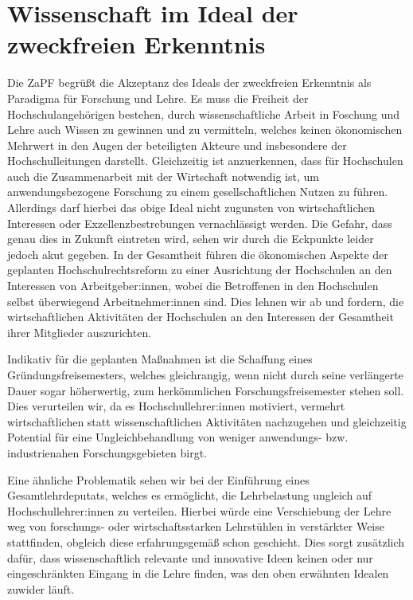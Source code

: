 \documentclass[a4paper]{scrartcl}
\begin{document}
\section{Wissenschaft im Ideal der zweckfreien Erkenntnis}

Die ZaPF begrüßt die Akzeptanz des Ideals der zweckfreien Erkenntnis als Paradigma für Forschung und Lehre.
Es muss die Freiheit der Hochschulangehörigen bestehen, durch wissenschaftliche Arbeit in Foschung und Lehre auch Wissen zu gewinnen und zu vermitteln, welches keinen ökonomischen Mehrwert in den Augen der beteiligten Akteure und insbesondere der Hochschulleitungen darstellt.
Gleichzeitig ist anzuerkennen, dass für Hochschulen auch die Zusammenarbeit mit der Wirtschaft notwendig ist, um anwendungsbezogene Forschung zu einem gesellschaftlichen Nutzen zu führen. Allerdings darf hierbei das obige Ideal nicht zugunsten von wirtschaftlichen Interessen oder Exzellenzbestrebungen vernachlässigt werden. Die Gefahr, dass genau dies in Zukunft eintreten wird, sehen wir durch die Eckpunkte leider jedoch akut gegeben. In der Gesamtheit führen die ökonomischen Aspekte der geplanten Hochschulrechtsreform zu einer Ausrichtung der Hochschulen an den Interessen von Arbeitgeber:innen, wobei die Betroffenen in den Hochschulen selbst überwiegend Arbeitnehmer:innen sind. Dies lehnen wir ab und fordern, die wirtschaftlichen Aktivitäten der Hochschulen an den Interessen der Gesamtheit ihrer Mitglieder auszurichten.

Indikativ für die geplanten Maßnahmen ist die Schaffung eines Gründungsfreisemesters, welches gleichrangig, wenn nicht durch seine verlängerte Dauer sogar höherwertig, zum herkömmlichen Forschungsfreisemester stehen soll. Dies verurteilen wir, da es Hochschullehrer:innen motiviert, vermehrt wirtschaftlichen statt wissenschaftlichen Aktivitäten nachzugehen und gleichzeitig Potential für eine Ungleichbehandlung von weniger anwendungs- bzw. industrienahen Forschungsgebieten birgt.

\newpage Eine ähnliche Problematik sehen wir bei der Einführung eines Gesamtlehrdeputats, welches es ermöglicht, die Lehrbelastung ungleich auf Hochschullehrer:innen zu verteilen. Hierbei würde eine Verschiebung der Lehre weg von forschungs- oder wirtschaftsstarken Lehrstühlen in verstärkter Weise stattfinden, obgleich diese erfahrungsgemäß schon geschieht. Dies sorgt zusätzlich dafür, dass wissenschaftlich relevante und innovative Ideen keinen oder nur eingeschränkten Eingang in die Lehre finden, was den oben erwähnten Idealen zuwider läuft.
\end{document}
